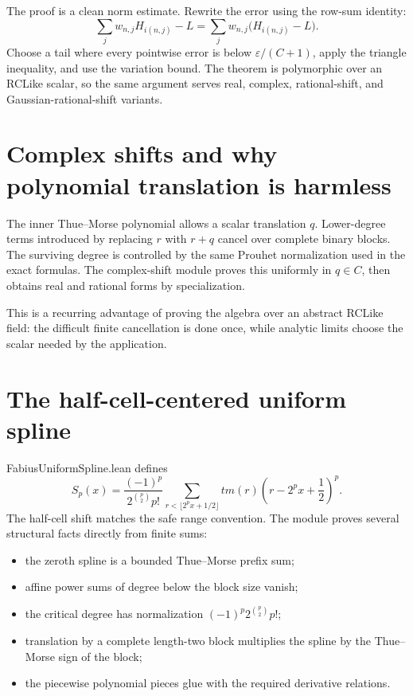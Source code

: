 \documentclass[11pt,a4paper,openany]{book}
\def\module#1{#1.lean}
\def\code#1{#1}
\def\TM{tm}
\def\C{C}
\newcommand{\C}{\ensuremath{\mathbb{C}}}
\newcommand{\TM}{\ensuremath{\operatorname{tm}}}
\newcommand{\module}[1]{\nolinkurl{#1.lean}}
\newcommand{\code}[1]{\texttt{\detokenize{#1}}}
\begin{document}
The proof is a clean norm estimate.  Rewrite the error using the row-sum
identity:
\[
 \sum_jw_{n,j}H_{i(n,j)}-L
 =\sum_jw_{n,j}\bigl(H_{i(n,j)}-L\bigr).
\]
Choose a tail where every pointwise error is below
$\varepsilon/(C+1)$, apply the triangle inequality, and use the variation
bound.  The theorem is polymorphic over an \code{RCLike} scalar, so the same
argument serves real, complex, rational-shift, and Gaussian-rational-shift
variants.

\section{Complex shifts and why polynomial translation is harmless}
The inner Thue--Morse polynomial allows a scalar translation $q$.  Lower-degree
terms introduced by replacing $r$ with $r+q$ cancel over complete binary
blocks.  The surviving degree is controlled by the same Prouhet normalization
used in the exact formulas.  The complex-shift module proves this uniformly in
$q\in\C$, then obtains real and rational forms by specialization.

This is a recurring advantage of proving the algebra over an abstract
\code{RCLike} field: the difficult finite cancellation is done once, while
analytic limits choose the scalar needed by the application.

\section{The half-cell-centered uniform spline}
\module{FabiusUniformSpline} defines
\[
 S_p(x)=\frac{(-1)^p}{2^{\binom p2}p!}
 \sum_{r<\lfloor2^p x+1/2\rfloor}
   \TM(r)\left(r-2^px+\frac12\right)^p.
\]
The half-cell shift matches the safe range convention.  The module proves
several structural facts directly from finite sums:
\begin{itemize}
  \item the zeroth spline is a bounded Thue--Morse prefix sum;
  \item affine power sums of degree below the block size vanish;
  \item the critical degree has normalization
        $(-1)^p2^{\binom p2}p!$;
  \item translation by a complete length-two block multiplies the spline by
        the Thue--Morse sign of the block;
  \item the piecewise polynomial pieces glue with the required derivative
        relations.
\end{itemize}
\end{document}
